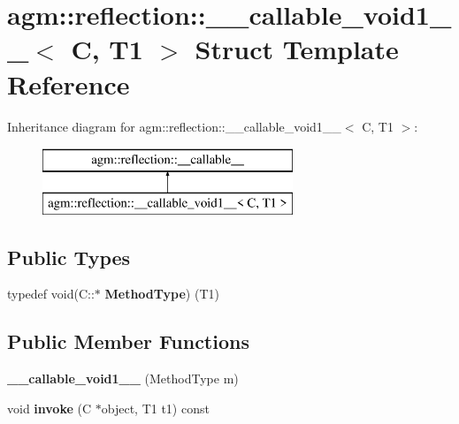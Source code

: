 \hypertarget{structagm_1_1reflection_1_1____callable__void1____}{}\section{agm\+:\+:reflection\+:\+:\+\_\+\+\_\+callable\+\_\+void1\+\_\+\+\_\+$<$ C, T1 $>$ Struct Template Reference}
\label{structagm_1_1reflection_1_1____callable__void1____}
Inheritance diagram for agm\+:\+:reflection\+:\+:\+\_\+\+\_\+callable\+\_\+void1\+\_\+\+\_\+$<$ C, T1 $>$\+:\begin{figure}[H]
\begin{center}
\leavevmode
\includegraphics[height=2.000000cm]{structagm_1_1reflection_1_1____callable__void1____}
\end{center}
\end{figure}
\subsection*{Public Types}
\begin{DoxyCompactItemize}
\item 
typedef void(C\+::$\ast$ {\bfseries Method\+Type}) (T1)\hypertarget{structagm_1_1reflection_1_1____callable__void1_____a13d39ba076ca295324219a617cb19851}{}\label{structagm_1_1reflection_1_1____callable__void1_____a13d39ba076ca295324219a617cb19851}

\end{DoxyCompactItemize}
\subsection*{Public Member Functions}
\begin{DoxyCompactItemize}
\item 
{\bfseries \+\_\+\+\_\+callable\+\_\+void1\+\_\+\+\_\+} (Method\+Type m)\hypertarget{structagm_1_1reflection_1_1____callable__void1_____ac9af65c397c97945f8b8b6faa8f9d75d}{}\label{structagm_1_1reflection_1_1____callable__void1_____ac9af65c397c97945f8b8b6faa8f9d75d}

\item 
void {\bfseries invoke} (C $\ast$object, T1 t1) const \hypertarget{structagm_1_1reflection_1_1____callable__void1_____a253c758ccd5c6b6562980922b68e08f3}{}\label{structagm_1_1reflection_1_1____callable__void1_____a253c758ccd5c6b6562980922b68e08f3}

\end{DoxyCompactItemize}
